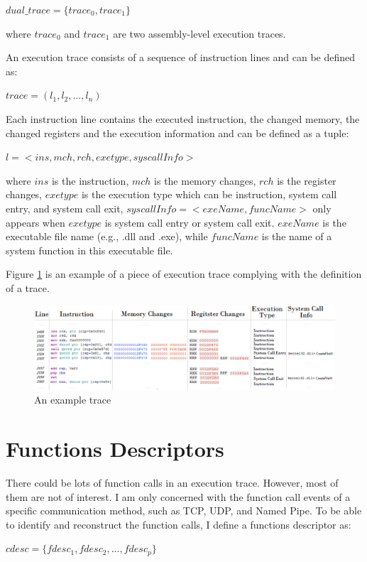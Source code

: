 \documentclass[12pt,oneside]{book}
\begin{document}
$dual\_trace = \lbrace trace_0, trace_1\rbrace$

where $trace_0$ and $trace_1$ are two assembly-level execution traces.

An execution trace consists of a sequence of instruction lines and can be defined as: 

$ trace = (l_1, l_2, ..., l_n)$ 

Each instruction line contains the executed instruction, the changed memory, the changed registers and the execution information and can be defined as a tuple:

$l = <ins, mch, rch, exetype, syscallInfo>$

where $ins$ is the instruction, $mch$ is the memory changes, $rch$ is the register changes, $exetype$ is the execution type which can be instruction, system call entry, and system call exit, $syscallInfo = <exeName, funcName>$ only appears when $exetype$ is system call entry or system call exit. $exeName$ is the executable file name (e.g., .dll and .exe), while $funcName$ is the name of a system function in this executable file.

Figure \ref{tracedefined} is an example of a piece of execution trace complying with the definition of a trace. 

\begin{figure}[H]
\centerline{\includegraphics[scale=0.5]{Figures/tracedefined}}
\caption{An example trace }
\label{tracedefined}
\end{figure}



\section{Functions Descriptors}\label{cdesc}
There could be lots of function calls in an execution trace. However, most of them are not of interest. I am only concerned with the function call events of a specific communication method, such as TCP, UDP, and Named Pipe. To be able to identify and reconstruct the function calls, I define a functions descriptor as:

$cdesc = \lbrace fdesc_1, fdesc_2,...,fdesc_p \rbrace$
\end{document}
